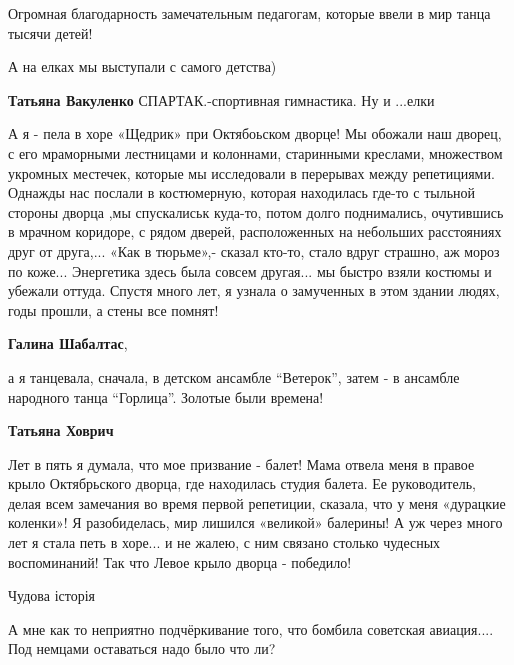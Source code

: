 \begin{itemize}
Огромная благодарность замечательным педагогам, которые ввели в мир танца тысячи детей!

А на елках мы выступали с самого детства)

\textbf{Татьяна Вакуленко} СПАРТАК.-спортивная гимнастика. Ну и ...елки


А я - пела в хоре «Щедрик» при Октябоьском дворце! Мы обожали наш дворец, с его
мраморными лестницами и колоннами, старинными креслами, множеством укромных
местечек, которые мы исследовали в перерывах между репетициями. Однажды нас
послали в костюмерную, которая находилась где-то с тыльной стороны дворца ,мы
спускалиськ куда-то, потом долго поднимались, очутившись в мрачном коридоре, с
рядом дверей, расположенных на небольших расстояниях друг от друга,... «Как в
тюрьме»,- сказал кто-то, стало вдруг страшно, аж мороз по коже... Энергетика
здесь была совсем другая... мы быстро взяли костюмы и убежали оттуда. Спустя много
лет, я узнала о замученных в этом здании людях, годы прошли, а стены все
помнят!

\begin{itemize} %
\textbf{Галина Шабалтас}, 

а я танцевала, сначала, в детском ансамбле \enquote{Ветерок}, затем - в ансамбле
народного танца \enquote{Горлица}. Золотые были времена!


\textbf{Татьяна Ховрич} 

Лет в пять я думала, что мое призвание - балет! Мама отвела меня в правое крыло
Октябрьского дворца, где находилась студия балета. Ее руководитель, делая всем
замечания во время первой репетиции, сказала, что у меня «дурацкие коленки»! Я
разобиделась, мир лишился «великой» балерины! А уж через много лет я стала петь
в хоре... и не жалею, с ним связано столько чудесных воспоминаний! Так что Левое
крыло дворца - победило!

\end{itemize} %

Чудова історія


А мне как то неприятно подчёркивание того, что бомбила советская авиация.... Под
немцами оставаться надо было что ли?

\end{itemize} %
